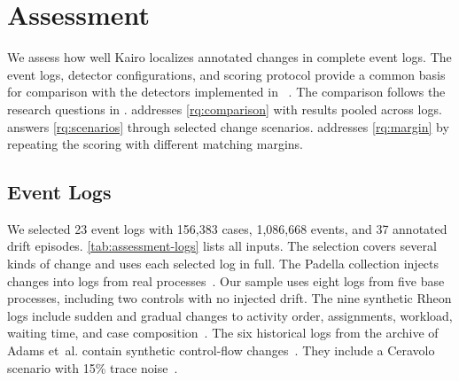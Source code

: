 \section{Assessment}
\label{sec:assessment}

We assess how well Kairo localizes annotated changes in complete event logs. The event logs, detector configurations, and scoring protocol provide a common basis for comparison with the detectors implemented in \softwarepm{}~\cite{berti2023pm4py}. The comparison follows the research questions in .  addresses \ref*{rq:comparison} with results pooled across logs.  answers \ref*{rq:scenarios} through selected change scenarios.  addresses \ref*{rq:margin} by repeating the scoring with different matching margins.

\subsection{Event Logs}
\label{sec:assessment-logs}

We selected 23 event logs with 156,383 cases, 1,086,668 events, and 37 annotated drift episodes. \autoref{tab:assessment-logs} lists all inputs. The selection covers several kinds of change and uses each selected log in full. The Padella collection injects changes into logs from real processes~\cite{padella2026dataset}. Our sample uses eight logs from five base processes, including two controls with no injected drift. The nine synthetic Rheon logs include sudden and gradual changes to activity order, assignments, workload, waiting time, and case composition~\cite{kairo-thesis}. The six historical logs from the archive of Adams et~al. contain synthetic control-flow changes~\cite{adams2023experimental}. They include a Ceravolo scenario with 15\% trace noise~\cite{tavares2019synthetic}.

